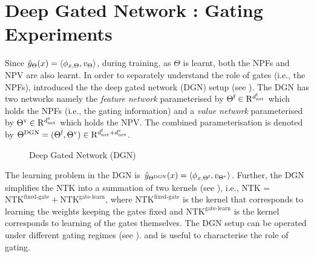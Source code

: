 \section{Deep Gated Network : Gating Experiments}\label{sec:dgn}
Since $\hat{y}_{\Theta}(x)=\langle \phi_{x,\Theta},v_{\Theta}\rangle$, during training, as $\Theta$ is learnt, both the NPFs and NPV are also learnt. In order to separately understand the role of gates (i.e., the NPFs),  \cite{npk} introduced the the deep gated network (DGN) setup (see ).  The DGN has two networks namely the \emph{feature network} parameterised by $\Theta^{\textrm{f}}\in\mathrm{R}^{d^{\text{f}}_{\text{net}}}$ which holds the NPFs (i.e., the gating information) and a \emph{value network} parameterised by ${\Theta}^{\text{v}}\in\mathrm{R}^{d^{\text{v}}_{\text{net}}}$ which holds the NPV.  The combined parameterisation is denoted by $\Theta^{\text{DGN}}=(\Theta^{\textrm{f}},{\Theta}^{\text{v}})\in \mathrm{R}^{d^{\text{f}}_{\text{net}}+d^{\text{v}}_{\text{net}}}$.  
\FloatBarrier
\begin{figure}[h]
\caption{Deep Gated Network (DGN)}
\label{fig:dgn}
\end{figure}
The learning problem in the DGN is $\hat{y}_{\Theta^{\text{DGN}}}(x)=\langle \phi_{x,\Theta^{\textrm{f}}},v_{{\Theta}^{\text{v}}}\rangle$. Further, the DGN simplifies the NTK into a summation of two kernels (see ), i.e., NTK = $\text{NTK}^{\text{fixed-gate}}+ \text{NTK}^\text{gate-learn}$, where $\text{NTK}^{\text{fixed-gate}}$ is the kernel that corresponds to learning the weights keeping the gates fixed and $\text{NTK}^\text{gate-learn}$ is the kernel corresponds to learning of the gates themselves. The DGN setup can be operated under different gating regimes (see ). and is useful to characterise the role of gating.
